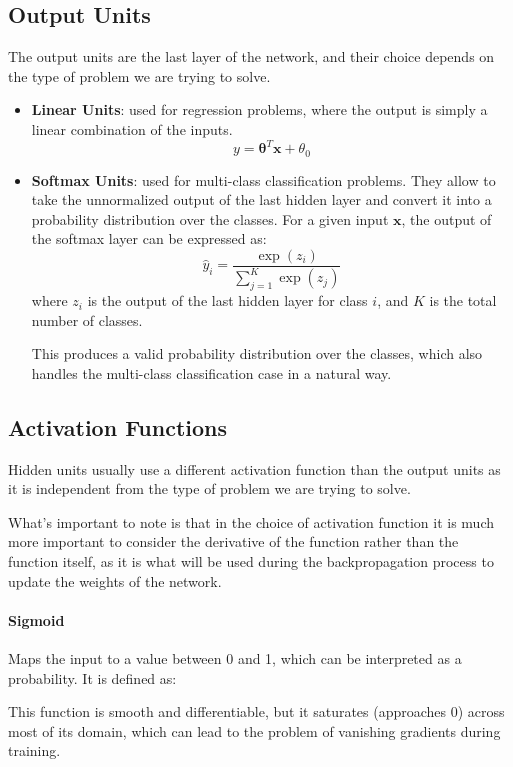 \subsection{Output Units}
The output units are the last layer of the network, and their choice depends on the type of problem we are trying to solve.
\begin{itemize}
    \item \textbf{Linear Units}: used for regression problems, where the output is simply a linear combination of the inputs.
    \begin{equation*}
        y = \boldsymbol{\theta}^T \boldsymbol{x} + \theta_0
    \end{equation*}
    
    \item \textbf{Softmax Units}: used for multi-class classification problems. They allow to take the unnormalized output of the last hidden layer
    and convert it into a probability distribution over the classes.
    For a given input $\boldsymbol{x}$, the output of the softmax layer can be expressed as:
    \begin{equation*}
        \hat{y}_i = \frac{\exp(z_i)}{\sum_{j=1}^{K} \exp(z_j)}
    \end{equation*}
    where $z_i$ is the output of the last hidden layer for class $i$, and $K$ is the total number of classes.

    This produces a valid probability distribution over the classes, which also handles the multi-class classification case in a natural way.
\end{itemize}

\subsection{Activation Functions}
Hidden units usually use a different activation function than the output units as it is independent from the type of problem we are trying to solve.

What's important to note is that in the choice of activation function it is much more important to 
consider the derivative of the function rather than the function itself, as it is what will be 
used during the backpropagation process to update the weights of the network.
\paragraph{Sigmoid}
Maps the input to a value between 0 and 1, which can be interpreted as a probability. It is defined as:
\begin{figure}[H]
    \centering
    
\end{figure}
This function is smooth and differentiable, but it saturates (approaches 0) across most of its domain,
which can lead to the problem of vanishing gradients during training.

